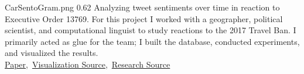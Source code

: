   {CarSentoGram.png}
  {0.62}
  {%
    Analyzing tweet sentiments over time in reaction to Executive Order 13769.
    For this project I worked with a geographer, political scientist, and computational linguist to study reactions to the 2017 Travel Ban.
    I primarily acted as glue for the team; I built the database, conducted experiments, and visualized the results.\\
    \raggedleft\href{https://www.tandfonline.com/doi/full/10.1080/15230406.2018.1510343}{Paper},\, \href{https://github.com/ryan-p-larson/paper}{Visualization Source},\, \href{https://github.com/ryan-p-larson/immigration-sentiment/}{Research Source}\quad
  }